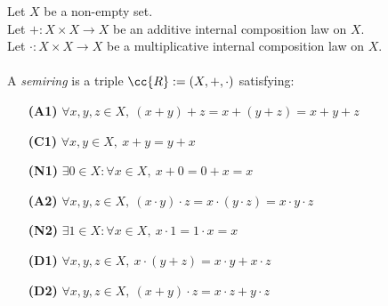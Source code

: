 \begin{definition-pre}[Semiring]
    \label{def:semiring}
    Let \(X\) be a non-empty set. \\
    Let \(+: X\times X \to X\) be an additive internal composition law on \(X\). \\
    Let \(\cdot: X\times X \to X\) be a multiplicative internal composition law on \(X\). \\\\
    A \textit{semiring} is a triple \(\cc{R}:= (X, +, \cdot)\) satisfying:
    \begin{enumerate}
        \item [\textbf{(A1)}] \(\forall x,y,z\in X,\ (x+y)+z= x+(y+z) = x+y+z\)
        \item [\textbf{(C1)}] \(\forall x,y\in X,\ x+y = y+x\)
        \item [\textbf{(N1)}] \(\exists 0 \in X : \forall x \in X,\ x+0 = 0+x = x\)
        \item [\textbf{(A2)}] \(\forall x,y,z\in X,\ (x\cdot y)\cdot z= x\cdot(y\cdot z) = x\cdot y\cdot z\)
        \item [\textbf{(N2)}] \(\exists 1 \in X : \forall x \in X,\ x\cdot1 = 1\cdot x = x\)
        \item [\textbf{(D1)}] \(\forall x,y,z \in X,\ x\cdot(y+z)=x\cdot y+x\cdot z\)
        \item [\textbf{(D2)}] \(\forall x,y,z \in X,\ (x+y)\cdot z=x\cdot z+y\cdot z\)
    \end{enumerate}
\end{definition-pre}
